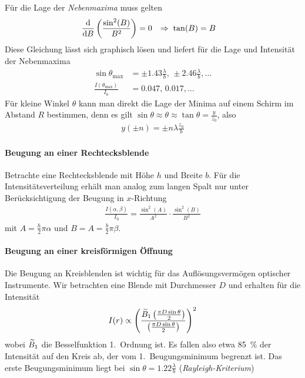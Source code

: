 Für die Lage der \emph{Nebenmaxima} muss gelten
\begin{align*}
  \frac{\mathrm{d} }{\mathrm{d} B} \left( \frac{\sin^2(B)}{B^2} \right) &= 0 
  &\Rightarrow\; \tan(B) &= B
\end{align*}
Diese Gleichung lässt sich graphisch lösen und liefert für die Lage
und Intensität der Nebenmaxima
\begin{align*}
  \sin\theta_\text{max}
  &= \pm \num{1,43}\frac{\lambda}{b},\,
    \pm \num{2,46}\frac{\lambda}{b},
    \dotsc\\
  \frac{I(\theta_\text{max})}{I_0} 
  &= \num{0,047} ,\,
    \num{0,017},
    \dotsc
\end{align*}
Für kleine Winkel $\theta$ kann man direkt die Lage der Minima auf
einem Schirm im Abstand $R$ bestimmen, denn es gilt
$\sin\theta\approx\theta\approx\tan\theta=\frac{y}{z_0}$, also
\begin{gather*}
  y(\pm n) = \pm n\lambda\frac{z_0}{b}
\end{gather*}


\paragraph{Beugung an einer Rechtecksblende}%
Betrachte eine Rechtecksblende mit 
Höhe $h$ und
Breite $b$.
Für die Intensitätsverteilung erhält man analog zum langen Spalt nur
unter Berücksichtigung der Beugung in $x$-Richtung
\begin{gather*}
  \frac{I(\alpha,\beta)}{I_0} = \frac{\sin^2(A)}{A^2} \cdot \frac{\sin^2(B)}{B^2}
\end{gather*}
mit $A=\frac{h}{2}\pi\alpha$ und $B=A=\frac{b}{2}\pi\beta$.

\paragraph{Beugung an einer kreisförmigen Öffnung}%
Die Beugung an Kreisblenden ist wichtig für das
Auflösungsvermögen optischer Instrumente.
Wir betrachten eine Blende mit Durchmesser
$D$ und erhalten für die
Intensität
\begin{gather*}
  I(r) \propto \left(
    \frac
    { \widetilde{B}_1 \left(\frac{\pi D\sin\theta}{2}\right) }
    { \left(\frac{\pi D\sin\theta}{2}\right) }
  \right)^2
\end{gather*}
wobei $\widetilde{B}_1$ die Besselfunktion 1.~Ordnung ist.
Es fallen also etwa \SI{85}{\percent} der Intensität auf den Kreis ab,
der vom 1.~Beugungsminimum begrenzt ist. Das erste Beugungsminimum
liegt bei $\sin\theta = \num{1,22}\frac{\lambda}{b}$ 
(\emph{Rayleigh-Kriterium})

